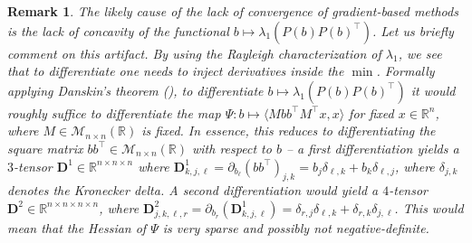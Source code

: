 \documentclass[11pt, a4paper, reqno]{amsart}
\newcommand{\del}{\partial}
\newcommand{\R}{\mathbb{R}}
\def\*#1{\mathbf{#1}}
\theoremstyle{plain}
\numberwithin{equation}{section}
\newtheorem{remark}{Remark}
\begin{document}
	\begin{remark} The likely cause of the lack of convergence of gradient-based methods is the lack of concavity of the functional $b\mapsto\lambda_1\left(P(b)P(b)^\top\right)$. Let us briefly comment on this artifact.  By using the Rayleigh characterization of $\lambda_1$, we see that to differentiate one needs to inject derivatives inside the $\min$. Formally applying Danskin's theorem (\citep{danskin1966theory}), to differentiate $b\mapsto\lambda_1\left(P(b)P(b)^\top\right)$ it would roughly suffice to differentiate the map $\Psi: b\mapsto \langle Mbb^\top M^\top x, x\rangle$ for fixed $x\in\R^n$, where $M\in\mathcal{M}_{n\times n}(\R)$ is fixed. In essence, this reduces to differentiating the square matrix $bb^\top\in\mathcal{M}_{n\times n}(\R)$ with respect to $b$ -- a first differentiation yields a $3$-tensor $\*D^1\in\R^{n\times n\times n}$ where $\*D^1_{k, j, \ell} = \del_{b_\ell} (bb^\top)_{j, k} = b_j\delta_{\ell,k}+b_k\delta_{\ell,j}$, where $\delta_{j,k}$ denotes the Kronecker delta. A second differentiation would yield a $4$-tensor $\*D^2\in\R^{n\times n \times n \times n}$, where $\*D^2_{j,k,\ell,r} = \del_{b_r}\left(\*D^1_{k, j, \ell} \right) = \delta_{r,j}\delta_{\ell,k} + \delta_{r,k}\delta_{j,\ell}$. This would mean that the Hessian of $\Psi$ is very sparse and possibly not negative-definite.
	\end{remark}
	
\end{document}
